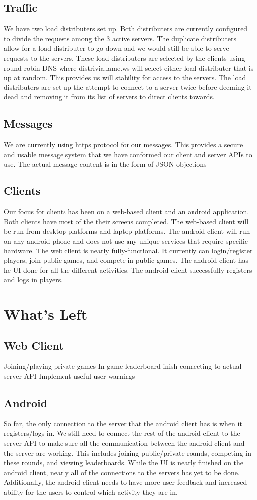 \documentclass{dependencies/acm_proc_article-sp}
\begin{document}
\subsection {Traffic}
We have two load distributers set up. Both distributers are currently configured to
divide the requests among the 3 active servers. The duplicate distributers allow
for a load distributer to go down and we would still be able to serve requests
to the servers. These load distributers are selected by the clients using round
robin DNS where distrivia.lame.ws will select either load distributer that is
up at random. This provides us will stability for access to the servers. The
load distributers are set up the attempt to connect to a server twice before
deeming it dead and removing it from its list of servers to direct clients towards.
\subsection {Messages}
We are currently using https protocol for our messages. This provides a secure
and usable message system that we have conformed our client and server APIs to use.
The actual message content is in the form of JSON objections \cite{json} 
\subsection {Clients}
Our focus for clients has been on a web-based client and an android application.
Both clients have most of the their screens completed. The web-based client will
be run from desktop platforms and laptop platforms. The android client will run
on any android phone and does not use any unique services that require specific
hardware. The web client is nearly fully-functional. It currently can login/register
players, join public games, and compete in public games. The android client has
he UI done for all the different activities. The android client successfully registers
and logs in players.

\section {What's Left}
\subsection {Web Client}
 Joining/playing private games
 In-game leaderboard
 inish connecting to actual server API
 Implement useful user warnings
\subsection {Android}
So far, the only connection to the server that the android client has is when it
registers/logs in. We still need to connect the rest of the android client to
the server API to make sure all the communication between the android client
and the server are working. This includes joining public/private rounds,
competing in these rounds, and viewing leaderboards. While the UI is nearly
finished on the android client, nearly all of the connections to the servers
has yet to be done. Additionally, the android client needs to have more user
feedback and increased ability for the users to control which activity they
are in.
\end{document}
